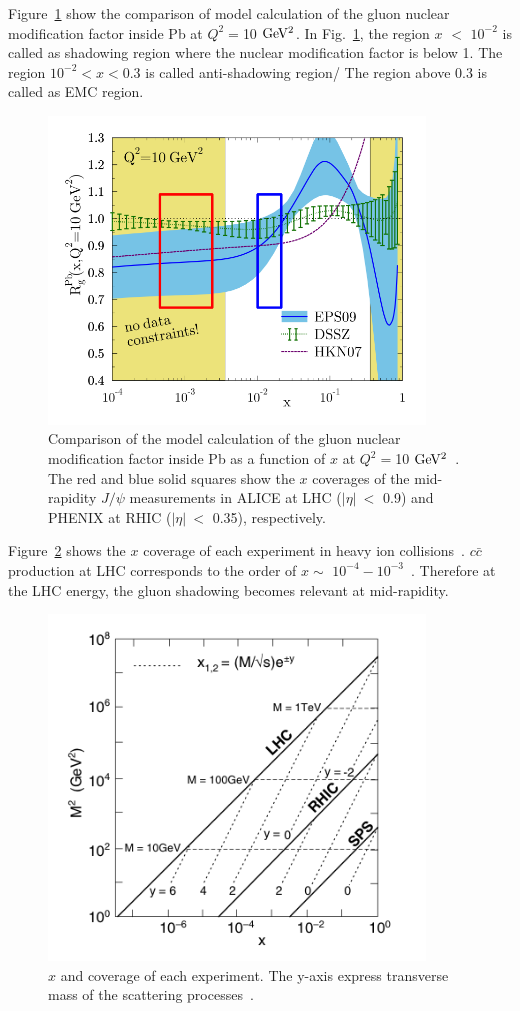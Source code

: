 Figure~\ref{fig_2_pdf} show the comparison of model calculation of the gluon nuclear modification factor inside Pb at $Q^{2}=$10 $\rm{GeV^{2}}$.
In Fig.~\ref{fig_2_pdf}, the region $x$ $<$ $10^{-2}$ is called as shadowing region where the nuclear modification factor is below 1. 
The region $10^{-2} < x < 0.3$ is called anti-shadowing region/ %
The region above 0.3 is called as EMC region. 
\begin{figure}[!h]
  \centering
  \includegraphics[width=10cm]{chap2/figure/CNM/gluonPDF.png}
  \caption{Comparison of the model calculation of the gluon nuclear modification factor inside Pb as a function of $x$ at $Q^{2}=$10 $\rm{GeV^{2}}$~\cite{bib_pdf}. The red and blue solid squares show the $x$ coverages of the mid-rapidity $J/\psi$ measurements in ALICE at LHC ($|\eta |~ <$ 0.9) and PHENIX at RHIC ($|\eta |~<$  0.35), respectively.}
  \label{fig_2_pdf}
\end{figure}
Figure~\ref{fig_2_xcover} shows the $x$ coverage of each experiment in heavy ion collisions~\cite{bib_aprv1}. 
$c\bar{c}$ production at LHC corresponds to the order of $x\sim$ $10^{-4}-10^{-3}$~\cite{bib_aprv1,bib_aprv2}.
Therefore at the LHC energy, the gluon shadowing becomes relevant at mid-rapidity. 
\begin{figure}[!h]
  \centering
  \includegraphics[width=10cm]{chap2/figure/experimentaldata/xcoverage.png}
  \caption{$x$ and coverage of each experiment. The y-axis express transverse mass of the scattering processes~\cite{bib_aprv1}.  }
  \label{fig_2_xcover}
\end{figure}

